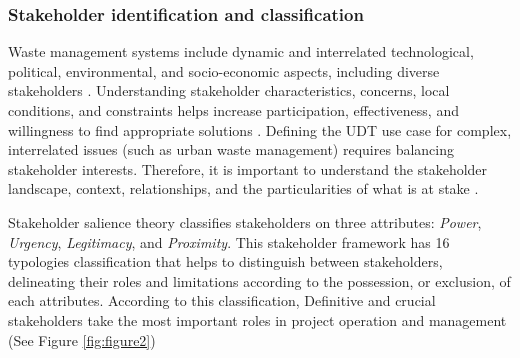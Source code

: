 \documentclass[authoryear,preprint,review,11pt,doubleblind]{elsarticle}
\begin{document}
    \subsubsection{Stakeholder identification and classification}
    \label{subsubsec:stakeholders}
    Waste management systems include dynamic and interrelated technological, political, environmental, and socio-economic aspects, including diverse stakeholders \citep{Zaman2011}. Understanding stakeholder characteristics, concerns, local conditions, and constraints helps increase participation, effectiveness, and willingness to find appropriate solutions \citep{Lishan2021, palacios-agundezIntegratingStakeholdersDemands2014}. Defining the UDT use case for complex, interrelated issues (such as urban waste management) requires balancing stakeholder interests. Therefore, it is important to understand the stakeholder landscape, context, relationships, and the particularities of what is at stake \citep{Freeman2010}.

     Stakeholder salience theory \citep{Mitchell1997, Shafique2022} classifies stakeholders on three attributes: \textit{Power}, \textit{Urgency},  \textit{Legitimacy}, and \textit{Proximity}. This stakeholder framework has 16 typologies classification that helps to distinguish between  stakeholders, delineating their roles and limitations according to the possession, or exclusion, of each attributes. According to this classification, Definitive and crucial stakeholders take the most important roles in project operation and management (See Figure \ref{fig:figure2})
    

    
\end{document}
